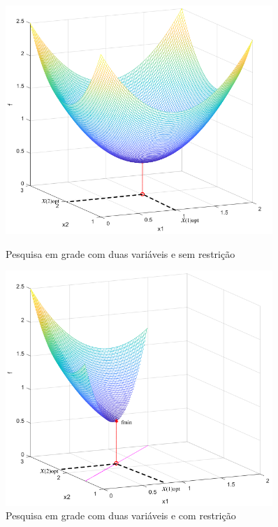 \begin{figure}[h]
    \centering
    \begin{minipage}{0.45\textwidth}
        \centering
        \includegraphics[width=0.9\textwidth]{./5_images/fig_grid_search_vectorial1.png} 
		\caption{Pesquisa em grade com duas variáveis e sem restrição}
		\label{fig_grid_search_vectorial_nobounds}
    \end{minipage}\hfill
    \begin{minipage}{0.45\textwidth}
        \centering
        \includegraphics[width=0.9\textwidth]{./5_images/fig_grid_search_vectorial2.png} 
		\caption{Pesquisa em grade com duas variáveis e com restrição}  
		\label{fig_grid_search_vectorial_withbounds}		      
	\end{minipage}
\end{figure}

